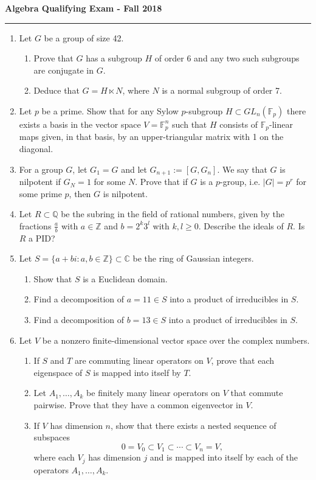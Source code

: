\documentclass[11pt,letterpaper]{report}
\newcommand{\integers}{\mathbb{Z}}
\newcommand{\complex}{\mathbb{C}}
\newcommand{\rationals}{\mathbb{Q}}
\newcommand{\field}{\mathbb{F}}
\begin{document}
\begin{center}
{\bf \Large Algebra Qualifying Exam - Fall 2018} %
\vspace{0.2cm}
\hrule
\end{center}

\begin{enumerate}
	\item Let $G$ be a group of size 42.
	\begin{enumerate}
		\item Prove that $G$ has a subgroup $H$ of order 6 and any two such subgroups are conjugate in $G$.
		\item Deduce that $G = H\ltimes N$, where $N$ is a normal subgroup of order 7.
	\end{enumerate}
	\vfill
	\item Let $p$ be a prime. Show that for any Sylow $p$-subgroup $H\subset GL_n(\field_p)$ there exists a basis in the vector space $V= \field_p^n$ such that $H$ consists of $\field_p$-linear maps given, in that basis, by an upper-triangular matrix with 1 on the diagonal.
	\vfill
	\item For a group $G$, let $G_1 = G$ and let $G_{n+1}:= [G, G_n]$. We say that $G$ is nilpotent if $G_N = 1$ for some $N$. Prove that if $G$ is a $p$-group, i.e. $|G| = p^r$ for some prime $p$, then $G$ is nilpotent.
	\vfill
	\item Let $R\subset \rationals$ be the subring in the field of rational numbers, given by the fractions $\frac{a}{b}$ with $a\in \integers$ and $b = 2^k3^l$ with $k,l\geq 0$. Describe the ideals of $R$. Is $R$ a PID?
	\vfill
	\item Let $S = \{a+bi: a,b\in \integers\}\subset \complex$ be the ring of Gaussian integers.
	\begin{enumerate}
		\item Show that $S$ is a Euclidean domain.
		\item Find a decomposition of $a = 11\in S$ into a product of irreducibles in $S$.
		\item Find a decomposition of $b=13\in S$ into a product of irreducibles in $S$. 
	\end{enumerate}
	\vfill
	\item Let $V$ be a nonzero finite-dimensional vector space over the complex numbers.
	\begin{enumerate}
		\item If $S$ and $T$ are commuting linear operators on $V$, prove that each eigenspace of $S$ is mapped into itself by $T$.
		\item Let $A_1, \ldots, A_k$ be finitely many linear operators on $V$ that commute pairwise. Prove that they have a common eigenvector in $V$.
		\item If $V$ has dimension $n$, show that there exists a nested sequence of subspaces
		\[
		0 = V_0 \subset V_1\subset \cdots \subset V_n = V,
		\]
		where each $V_j$ has dimension $j$ and is mapped into itself by each of the operators $A_1, \ldots, A_k$.
	\end{enumerate}
	\vfill\null\pagebreak


\end{enumerate}
\end{document}
